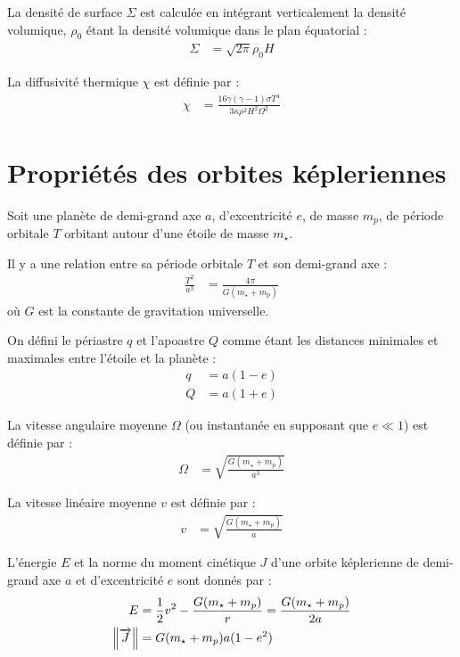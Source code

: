 La densité de surface $\Sigma$ est calculée en intégrant verticalement la densité volumique, $\rho_0$ étant la densité volumique dans le plan équatorial : 
\begin{align}
\Sigma &= \sqrt{2\pi}\rho_0 H
\end{align}

La diffusivité thermique $\chi$ est définie par : 
\begin{align}
\chi &= \frac{16\gamma (\gamma - 1) \sigma T^4}{3\kappa\rho^2H^2\Omega^2}
\end{align}

\section{Propriétés des orbites képleriennes}
Soit une planète de demi-grand axe $a$, d'excentricité $e$, de masse $m_p$, de période orbitale $T$ orbitant autour d'une étoile de masse $m_\star$. 

Il y a une relation entre sa période orbitale $T$ et son demi-grand axe :
\begin{align}
\frac{T^2}{a^3} &= \frac{4\pi}{G(m_\star + m_p)}
\end{align}
où $G$ est la constante de gravitation universelle.

On défini le périastre $q$ et l'apoastre $Q$ comme étant les distances minimales et maximales entre l'étoile et la planète : 
\begin{subequations}
\begin{align}
q &= a (1 - e)\\
Q &= a (1 + e)
\end{align}
\end{subequations}

La vitesse angulaire moyenne $\Omega$ (ou instantanée en supposant que $e\ll 1$) est définie par : 
\begin{align}
\Omega &= \sqrt{\frac{G(m_\star + m_p)}{a^3}}
\end{align}

La vitesse linéaire moyenne $v$ est définie par : 
\begin{align}
v &= \sqrt{\frac{G(m_\star + m_p)}{a}}
\end{align}

L'énergie $E$ et la norme du moment cinétique $J$ d'une orbite képlerienne de demi-grand axe $a$ et d'excentricité $e$ sont donnés par :
\begin{align}
E &= \frac{1}{2}v^2 - \frac{G(m_\star + m_p)}{r} = \frac{G(m_\star + m_p)}{2a}\\
\left\|{\overrightarrow{J}}\right\| &= G(m_\star + m_p) a (1-e^2)
\end{align}

